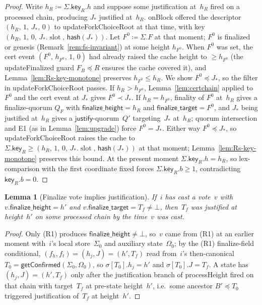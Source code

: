 \documentclass{article}
\newcommand{\slot}[0]{\ensuremath{\operatorname{\mathrm{slot}}}}
\newcommand{\just}{\ensuremath{\mathsf{justify}}\xspace}
\newcommand{\finalizeHeight}{\mathsf{finalize\_height}}
\newcommand{\finalizeTarget}{\mathsf{finalize\_target}}
\newcommand{\hash}{\mathsf{hash}}
\newcommand{\key}{\mathsf{key}}
\newcommand{\processHeight}{\textsf{processHeight}\xspace}
\newcommand{\onBlock}{\textsf{onBlock}\xspace}
\newcommand{\updateForkChoiceRoot}{\textsf{updateForkChoiceRoot}\xspace}
\newcommand{\updateFinalized}{\textsf{updateFinalized}\xspace}
\newcommand{\getConfirmed}{\textsf{getConfirmed}\xspace}
\theoremstyle{plain}
\newtheorem{lemma}{Lemma}
\theoremstyle{definition}
\theoremstyle{remark}
\begin{document}
\begin{proof}
Write $h_R \coloneqq \Sigma.\key_R.h$ and suppose some justification at~$h_R$ fired on a processed chain, producing $J_\ast$ justified at~$h_R$.
\onBlock offered the descriptor $(h_R,\, 1,\, J_\ast,\, 0)$ to \updateForkChoiceRoot at that time, with key $(h_R,\, 1,\, 0,\, J_\ast.\slot,\, \hash(J_\ast))$.
Let $F^0 \coloneqq \Sigma.F$ at that moment; $F^0$ is finalized or genesis (Remark~\ref{rem:fs-invariant}) at some height $h_{F^0}$.
When $F^0$ was set, the cert event $(F^0,\, h_{F^0},\, 1,\, 0)$ had already raised the cache height to $\geq h_{F^0}$ (the \updateFinalized guard $F_B \preceq R$ ensures the cache covered it), and Lemma~\ref{lem:Rs-key-monotone} preserves $h_{F^0} \leq h_R$.
We show $F^0 \preceq J_\ast$, so the filter in \updateForkChoiceRoot passes.
If $h_R > h_{F^0}$, Lemma~\ref{lem:certchain} applied to $F^0$ and the cert event at $J_\ast$ gives $F^0 \prec J_\ast$.
If $h_R = h_{F^0}$, finality of $F^0$ at~$h_R$ gives a finalize-quorum $Q_F$ with $\finalizeHeight = h_R$ and $\finalizeTarget = F^0$, and $J_\ast$ being justified at~$h_R$ gives a \just-quorum~$Q'$ targeting~$J_\ast$ at~$h_R$; quorum intersection and E1 (as in Lemma~\ref{lem:upgrade}) force $F^0 = J_\ast$.
Either way $F^0 \preceq J_\ast$, so \updateForkChoiceRoot raises the cache to $\Sigma.\key_R \geq (h_R,\, 1,\, 0,\, J_\ast.\slot,\, \hash(J_\ast))$ at that moment; Lemma~\ref{lem:Rs-key-monotone} preserves this bound.
At the present moment $\Sigma.\key_R.h = h_R$, so lex-comparison with the first coordinate fixed forces $\Sigma.\key_R.b \geq 1$, contradicting $\key_R.b = 0$.
\end{proof}

\begin{lemma}[Finalize vote implies justification]\label{lem:no-finalize-without-just}
If~$i$ has cast a vote~$v$ with $v.\finalizeHeight = h'$ and $v.\finalizeTarget = T_f \neq \bot$, then~$T_f$ was justified at height~$h'$ on some processed chain by the time~$v$ was cast.
\end{lemma}

\begin{proof}
Only (R1) produces $\finalizeHeight \neq \bot$, so~$v$ came from (R1) at an earlier moment with~$i$'s local store~$\Sigma_0$ and auxiliary state~$\Omega_0$; by the (R1) finalize-field conditional, $(f_h, f_t) = (h_j, J) = (h', T_f)$ read from~$i$'s then-canonical $T_0 = \getConfirmed(\Sigma_0, \Omega_0)$, so $\sigma[T_0].h_j = h'$ and $\sigma[T_0].J = T_f$.
A state has $(h_j, J) = (h', T_f)$ only after the justification branch of \processHeight fired on that chain with target~$T_f$ at pre-state height~$h'$, i.e.\ some ancestor $B' \preceq T_0$ triggered justification of~$T_f$ at height~$h'$.
\end{proof}
\end{document}

